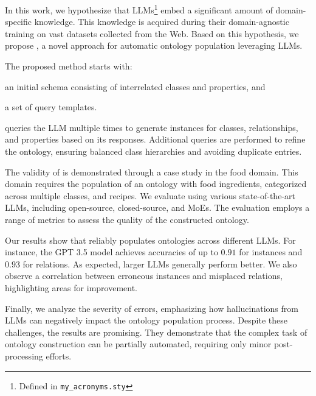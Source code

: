 In this work, we hypothesize that \glspl{LLM}\footnote{Defined in \texttt{my\_acronyms.sty}} embed a significant amount of domain-specific knowledge.
%
This knowledge is acquired during their domain-agnostic training on vast datasets collected from the Web.
%
Based on this hypothesis, we propose \llmfkg{}, a novel approach for automatic ontology population leveraging \glspl{LLM}.
%

The proposed method starts with:
%
\begin{inlinelist}
    \item an initial schema consisting of interrelated classes and properties, and
    \item a set of query templates.
\end{inlinelist}
%
\llmfkg{} queries the \gls{LLM} multiple times to generate instances for classes, relationships, and properties based on its responses.
%
Additional queries are performed to refine the ontology, ensuring balanced class hierarchies and avoiding duplicate entries.
%

The validity of \llmfkg{} is demonstrated through a case study in the food domain.
%
This domain requires the population of an ontology with food ingredients, categorized across multiple classes, and recipes.
%
We evaluate \llmfkg{} using various state-of-the-art \glspl{LLM}, including open-source, closed-source, and \glspl{MoE}.
%
The evaluation employs a range of metrics to assess the quality of the constructed ontology.
%

Our results show that \llmfkg{} reliably populates ontologies across different \glspl{LLM}.
%
For instance, the GPT 3.5 model achieves accuracies of up to \(0.91\) for instances and \(0.93\) for relations.
%
As expected, larger \glspl{LLM} generally perform better.
%
We also observe a correlation between erroneous instances and misplaced relations, highlighting areas for improvement.
%

Finally, we analyze the severity of errors, emphasizing how hallucinations from \glspl{LLM} can negatively impact the ontology population process.
%
Despite these challenges, the results are promising.
%
They demonstrate that the complex task of ontology construction can be partially automated, requiring only minor post-processing efforts.
%



